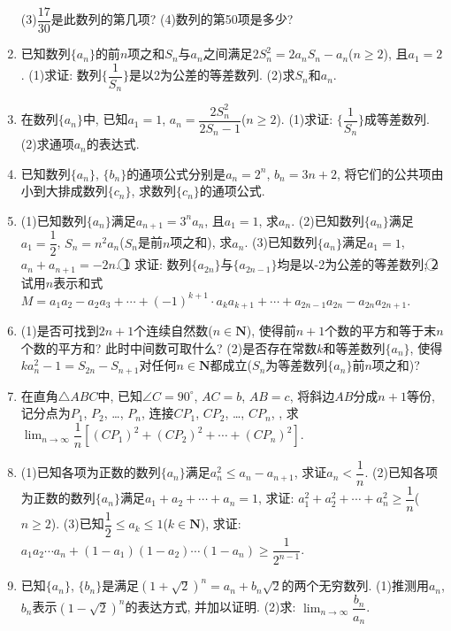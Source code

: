 \documentclass[10pt,a4paper]{article}
\begin{document}
\begin{enumerate}[1.]
(3)$\dfrac{17}{30}$是此数列的第几项?
(4)数列的第50项是多少?
\item 已知数列$\{a_n\}$的前$n$项之和$S_n$与$a_n$之间满足$2S_n^2=2a_nS_n-a_n$($n\ge 2$), 且$a_1=2$.
(1)求证: 数列$\{\dfrac 1{S_n}\}$是以2为公差的等差数列.
(2)求$S_n$和$a_n$.
\item 在数列$\{a_n\}$中, 已知$a_1=1$, $a_n=\dfrac{2S_n^2}{2{S_n}-1}$($n\ge 2$).
(1)求证: $\{\dfrac 1{S_n}\}$成等差数列.
(2)求通项$a_n$的表达式.
\item 已知数列$\{a_n\}$, $\{b_n\}$的通项公式分别是$a_n=2^n$, $b_n=3n+2$, 将它们的公共项由小到大排成数列$\{c_n\}$, 求数列$\{c_n\}$的通项公式.
\item (1)已知数列$\{a_n\}$满足$a_{n+1}=3^na_n$, 且$a_1=1$, 求$a_n$.
(2)已知数列$\{a_n\}$满足$a_1=\dfrac 12$, $S_n=n^2a_n$($S_n$是前$n$项之和), 求$a_n$.
(3)已知数列$\{a_n\}$满足$a_1=1$, $a_n+a_{n+1}=-2n$.
\textcircled{1} 求证: 数列$\{a_{2n}\}$与$\{a_{2n-1}\}$均是以-2为公差的等差数列;
\textcircled{2} 试用$n$表示和式$M=a_1a_2-a_2a_3+\cdots +(-1)^{k+1}\cdot a_ka_{k+1}+\cdots +a_{2n-1}a_{2n}-a_{2n}a_{2n+1}$.
\item (1)是否可找到$2n+1$个连续自然数($n\in \mathbf{N}$), 使得前$n+1$个数的平方和等于末$n$个数的平方和? 此时中间数可取什么?
(2)是否存在常数$k$和等差数列$\{a_n\}$, 使得$ka_n^2-1=S_{2n}-S_{n+1}$对任何$n\in \mathbf{N}$都成立($S_n$为等差数列$\{a_n\}$前$n$项之和)?
\item 在直角$\triangle ABC$中, 已知$\angle C=90^\circ$, $AC=b$, $AB=c$, 将斜边$AB$分成$n+1$等份, 记分点为$P_1$, $P_2$, …, $P_n$, 连接$CP_1$, $CP_2$, …, $CP_n$, , 求$\displaystyle \lim_{n\to \infty} \dfrac 1n[(CP_1)^2+(CP_2)^2+\cdots +(CP_n)^2]$.
\item (1)已知各项为正数的数列$\{a_n\}$满足$a_n^2\le a_n-a_{n+1}$, 求证$a_n<\dfrac 1n$.
(2)已知各项为正数的数列$\{a_n\}$满足$a_1+a_2+\cdots +a_n=1$, 求证: $a_1^2+a_2^2+\cdots +a_n^2\ge \dfrac 1n$($n\ge 2$).
(3)已知$\dfrac 12\le a_k\le 1$($k\in \mathbf{N}$), 求证: $a_1a_2\cdots a_n+(1-a_1)(1-a_2)\cdots (1-a_n)\ge \dfrac 1{2^{n-1}}$.
\item 已知$\{a_n\}$, $\{b_n\}$是满足$(1+\sqrt 2)^n=a_n+b_n\sqrt 2$的两个无穷数列.
(1)推测用$a_n$, $b_n$表示$(1-\sqrt 2)^n$的表达方式, 并加以证明.
(2)求: $\displaystyle \lim_{n\to \infty} \dfrac{b_n}{a_n}$.


\end{enumerate}
\end{document}
